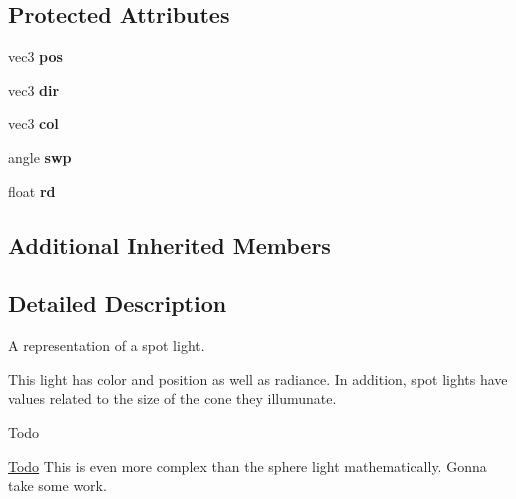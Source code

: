 \subsection*{Protected Attributes}
\begin{DoxyCompactItemize}
\item 
\hypertarget{classgfx_1_1spot__light_a6f81e421dbc054dd39036fc775a7c5f7}{vec3 {\bfseries pos}}\label{classgfx_1_1spot__light_a6f81e421dbc054dd39036fc775a7c5f7}

\item 
\hypertarget{classgfx_1_1spot__light_a95ef8c2bc861ad91268a934b24bba00a}{vec3 {\bfseries dir}}\label{classgfx_1_1spot__light_a95ef8c2bc861ad91268a934b24bba00a}

\item 
\hypertarget{classgfx_1_1spot__light_a2ecf58433a02c9b22224ba045ed69895}{vec3 {\bfseries col}}\label{classgfx_1_1spot__light_a2ecf58433a02c9b22224ba045ed69895}

\item 
\hypertarget{classgfx_1_1spot__light_a48c1df10ff11bed99c9402ccfed57955}{angle {\bfseries swp}}\label{classgfx_1_1spot__light_a48c1df10ff11bed99c9402ccfed57955}

\item 
\hypertarget{classgfx_1_1spot__light_a7e4309b83276b87c35f36712db3e8727}{float {\bfseries rd}}\label{classgfx_1_1spot__light_a7e4309b83276b87c35f36712db3e8727}

\end{DoxyCompactItemize}
\subsection*{Additional Inherited Members}


\subsection{Detailed Description}
A representation of a spot light. 

This light has color and position as well as radiance. In addition, spot lights have values related to the size of the cone they illumunate. \begin{DoxyRefDesc}{Todo}
\item[\hyperlink{todo__todo000025}{Todo}]This is even more complex than the sphere light mathematically. Gonna take some work. \end{DoxyRefDesc}


